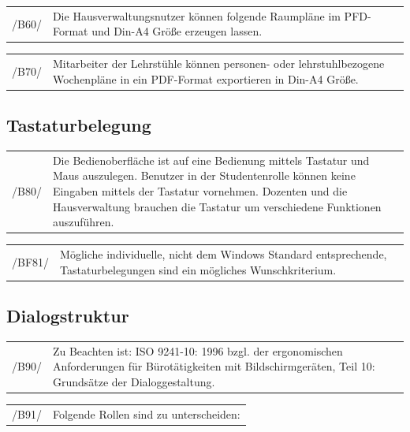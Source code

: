 \begin{tabular}{p{1.5cm}p{14.5cm}}
 /B60/	& Die Hausverwaltungsnutzer können folgende Raumpläne im PFD-Format und Din-A4 Größe erzeugen lassen. \\[0.25cm]	 
\end{tabular}

\begin{tabular}{p{1.5cm}p{14.5cm}}
 /B70/	& Mitarbeiter der Lehrstühle können personen- oder lehrstuhlbezogene Wochenpläne in ein PDF-Format exportieren in Din-A4 Größe. \\[0.25cm]	 
\end{tabular}
 
\subsection{Tastaturbelegung}

\begin{tabular}{p{1.5cm}p{14.5cm}}
 /B80/	& Die Bedienoberfläche ist auf eine Bedienung mittels Tastatur und Maus auszulegen. Benutzer in der Studentenrolle können keine Eingaben mittels der Tastatur vornehmen. Dozenten und die Hausverwaltung brauchen die Tastatur um verschiedene Funktionen auszuführen. \\[0.25cm]	 
\end{tabular}

\begin{tabular}{p{1.5cm}p{14.5cm}}
 /BF81/	& Mögliche individuelle, nicht dem Windows Standard entsprechende, Tastaturbelegungen sind ein mögliches  Wunschkriterium. \\[0.25cm]	 
\end{tabular}


\subsection{Dialogstruktur}

\begin{tabular}{p{1.5cm}p{14.5cm}}
 /B90/	& Zu Beachten ist: ISO 9241-10: 1996 bzgl. der ergonomischen Anforderungen für Bürotätigkeiten mit Bildschirmgeräten, Teil 10: Grundsätze der Dialoggestaltung. \\[0.25cm]	 
\end{tabular}

\begin{tabular}{p{1.5cm}p{14.5cm}}
 /B91/	& Folgende Rollen sind zu unterscheiden: \\[0.25cm]	 
\end{tabular}\\


